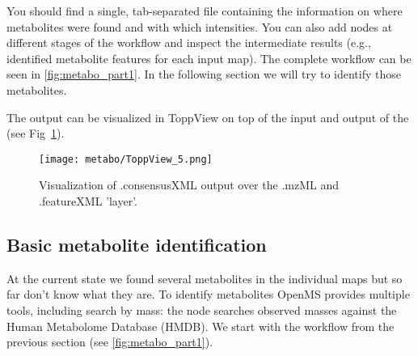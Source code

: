 You should find a single, tab-separated file containing the information on where metabolites were found and with which intensities.
You can also add  nodes at different stages of the workflow and inspect the intermediate results (e.g., identified metabolite features for each input map).
The complete workflow can be seen in \cref{fig:metabo_part1}.
In the following section we will try to identify those metabolites.

\noindent The  output can be visualized in ToppView on top of the input and output of the  (see Fig~\ref{fig:ToppView_5}). 

\begin{figure}[htbp]
  \centering
  \texttt{[image: metabo/ToppView\_5.png]}
  \caption{Visualization of .consensusXML output over the .mzML and .featureXML 'layer'. }
  \label{fig:ToppView_5}
\end{figure}

\subsection{Basic metabolite identification}

At the current state we found several metabolites in the individual maps but so far don't know what they are.
To identify metabolites OpenMS provides multiple tools, including search by mass: the  node searches observed masses against the Human Metabolome Database (HMDB)\cite{Wishart2007,Wishart2009,Wishart2013}.
We start with the workflow from the previous section (see \cref{fig:metabo_part1}).

